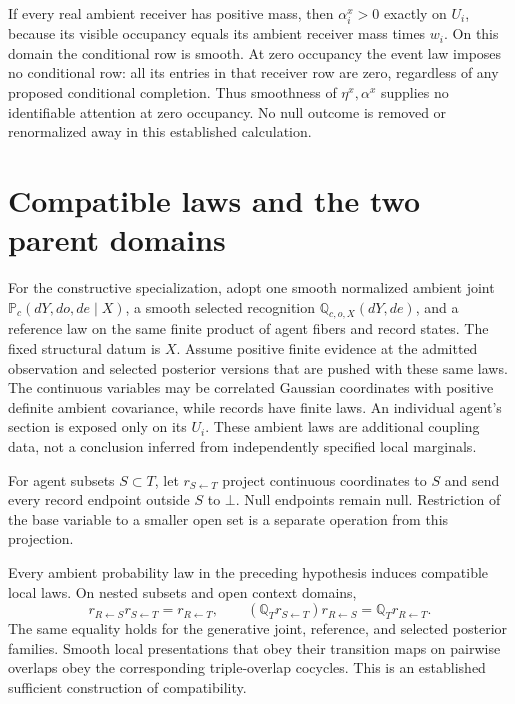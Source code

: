 If every real ambient receiver has positive mass, then
\(\alpha_i^x>0\) exactly on \(U_i\), because its visible occupancy equals
its ambient receiver mass times \(w_i\). On this domain the conditional
row is smooth. At zero occupancy the event law imposes no conditional row:
all its entries in that receiver row are zero, regardless of any proposed
conditional completion. Thus smoothness of \(\eta^x,\alpha^x\) supplies
no identifiable attention at zero occupancy. No null outcome is removed or
renormalized away in this established calculation.

\section{Compatible laws and the two parent domains}
\label{sec:rg-cover-law-descent}

For the constructive specialization, adopt one smooth normalized ambient
joint \(\mathbb P_c(dY,do,de\mid X)\), a smooth selected recognition
\(\mathbb Q_{c,o,X}(dY,de)\), and a reference law on the same finite
product of agent fibers and record states. The fixed structural datum is
\(X\). Assume positive finite evidence at the admitted observation and
selected posterior versions that are pushed with these same laws. The
continuous variables may be correlated Gaussian coordinates with positive
definite ambient covariance, while records have finite laws. An individual
agent's section is exposed only on its \(U_i\). These ambient laws are
additional coupling data, not a conclusion inferred from independently
specified local marginals. 

For agent subsets \(S\subset T\), let \(r_{S\leftarrow T}\) project
continuous coordinates to \(S\) and send every record endpoint outside
\(S\) to \(\bot\). Null endpoints remain null. Restriction of the base
variable to a smaller open set is a separate operation from this projection.

Every ambient probability law in the preceding hypothesis induces compatible
local laws. On nested subsets and open context domains,
\begin{equation}
 r_{R\leftarrow S}r_{S\leftarrow T}=r_{R\leftarrow T},
 \qquad
 (\mathbb Q_T r_{S\leftarrow T})r_{R\leftarrow S}
 =\mathbb Q_T r_{R\leftarrow T}.
\label{eq:rg-cover-restriction-law}
\end{equation}
The same equality holds for the generative joint, reference, and selected
posterior families. Smooth local presentations that obey their transition
maps on pairwise overlaps obey the corresponding triple-overlap cocycles.
This is an established sufficient construction of compatibility.

